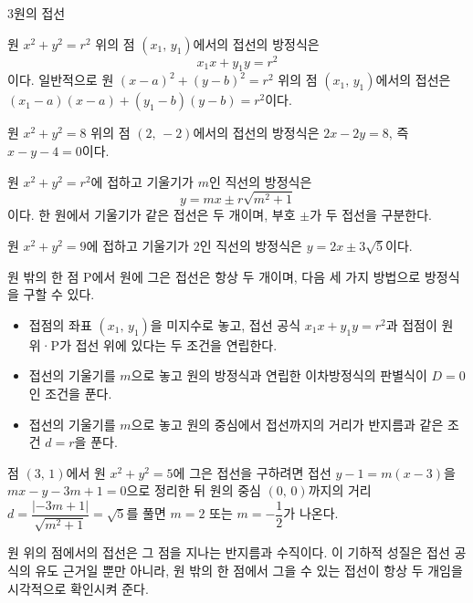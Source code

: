 \documentclass[10pt]{article}
\begin{document}
\begin{dmconcept}{3}{원의 접선}
\setlength{\parskip}{1.6mm plus 1.7mm minus 0mm}\linespread{1.24}\selectfont%


원 $x^2 + y^2 = r^2$ 위의 점 $(x_1,\, y_1)$에서의 접선의 방정식은
\begin{equation*}
  x_1 x + y_1 y = r^2
\end{equation*}
이다. 일반적으로 원 $(x - a)^2 + (y - b)^2 = r^2$ 위의 점 $(x_1,\, y_1)$에서의 접선은 $(x_1 - a)(x - a) + (y_1 - b)(y - b) = r^2$이다.

\begin{dmexample}
원 $x^2 + y^2 = 8$ 위의 점 $(2,\, -2)$에서의 접선의 방정식은 $2x - 2y = 8$, 즉 $x - y - 4 = 0$이다.
\end{dmexample}


원 $x^2 + y^2 = r^2$에 접하고 기울기가 $m$인 직선의 방정식은
\begin{equation*}
  y = mx \pm r\sqrt{m^2 + 1}
\end{equation*}
이다. 한 원에서 기울기가 같은 접선은 두 개이며, 부호 $\pm$가 두 접선을 구분한다.

\begin{dmexample}
원 $x^2 + y^2 = 9$에 접하고 기울기가 $2$인 직선의 방정식은 $y = 2x \pm 3\sqrt{5}$이다.
\end{dmexample}


원 밖의 한 점 $\mathrm{P}$에서 원에 그은 접선은 항상 두 개이며, 다음 세 가지 방법으로 방정식을 구할 수 있다.
\begin{itemize}[leftmargin=8mm, itemsep=0.5mm, topsep=1mm]
  \item 접점의 좌표 $(x_1,\, y_1)$을 미지수로 놓고, 접선 공식 $x_1 x + y_1 y = r^2$과 접점이 원 위·$\mathrm{P}$가 접선 위에 있다는 두 조건을 연립한다.
  \item 접선의 기울기를 $m$으로 놓고 원의 방정식과 연립한 이차방정식의 판별식이 $D = 0$인 조건을 푼다.
  \item 접선의 기울기를 $m$으로 놓고 원의 중심에서 접선까지의 거리가 반지름과 같은 조건 $d = r$을 푼다.
\end{itemize}

\begin{dmexample}
점 $(3,\, 1)$에서 원 $x^2 + y^2 = 5$에 그은 접선을 구하려면 접선 $y - 1 = m(x - 3)$을 $mx - y - 3m + 1 = 0$으로 정리한 뒤 원의 중심 $(0,\, 0)$까지의 거리 $d = \dfrac{|{-3m + 1}|}{\sqrt{m^2 + 1}} = \sqrt{5}$를 풀면 $m = 2$ 또는 $m = -\dfrac{1}{2}$가 나온다.
\end{dmexample}

\begin{dmnote}
원 위의 점에서의 접선은 그 점을 지나는 반지름과 수직이다. 이 기하적 성질은 접선 공식의 유도 근거일 뿐만 아니라, 원 밖의 한 점에서 그을 수 있는 접선이 항상 두 개임을 시각적으로 확인시켜 준다.
\end{dmnote}

\end{dmconcept}
\end{document}
